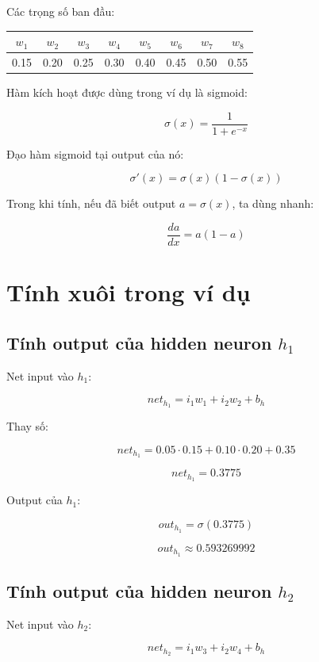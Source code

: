 \documentclass[12pt,a4paper]{report}
\begin{document}
Các trọng số ban đầu:

\begin{center}
\begin{tabular}{cccccccc}
\toprule
$w_1$ & $w_2$ & $w_3$ & $w_4$ & $w_5$ & $w_6$ & $w_7$ & $w_8$ \\
\midrule
0.15 & 0.20 & 0.25 & 0.30 & 0.40 & 0.45 & 0.50 & 0.55 \\
\bottomrule
\end{tabular}
\end{center}

Hàm kích hoạt được dùng trong ví dụ là sigmoid:

\[
    \sigma(x)=\frac{1}{1+e^{-x}}
\]

Đạo hàm sigmoid tại output của nó:

\[
    \sigma'(x)=\sigma(x)\left(1-\sigma(x)\right)
\]

Trong khi tính, nếu đã biết output $a=\sigma(x)$, ta dùng nhanh:

\[
    \frac{da}{dx}=a(1-a)
\]

\chapter{Tính xuôi trong ví dụ}

\section{Tính output của hidden neuron $h_1$}

Net input vào $h_1$:

\[
    net_{h_1}=i_1w_1+i_2w_2+b_h
\]

Thay số:

\[
    net_{h_1}
    =
    0.05\cdot 0.15
    +
    0.10\cdot 0.20
    +
    0.35
\]

\[
    net_{h_1}=0.3775
\]

Output của $h_1$:

\[
    out_{h_1}=\sigma(0.3775)
\]

\[
    out_{h_1}\approx 0.593269992
\]

\section{Tính output của hidden neuron $h_2$}

Net input vào $h_2$:

\[
    net_{h_2}=i_1w_3+i_2w_4+b_h
\]
\end{document}
